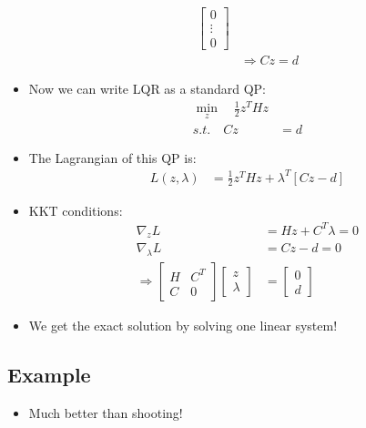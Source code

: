 \documentclass[11pt]{article}
\begin{document}
\begin{itemize}
\begin{align*}
\begin{bmatrix}
            0 \\
            \vdots \\
            0
        \end{bmatrix}
        \\
        &\Rightarrow Cz = d
    \end{align*}
    \item Now we can write LQR as a standard QP:
    \begin{align*}
        \min_z \quad \frac{1}{2}z^THz
        \\
        s.t. \quad Cz &= d
    \end{align*}
    \item The Lagrangian of this QP is:
    \begin{align*}
        L(z,\lambda) &= \frac{1}{2}z^THz + \lambda^T[Cz-d]
    \end{align*}
    \item  KKT conditions:
    \begin{align*}
        \nabla_zL &= Hz + C^T\lambda = 0
        \\
        \nabla_\lambda L &= Cz-d = 0
        \\
        \Rightarrow \begin{bmatrix}
            H & C^T \\
            C & 0
        \end{bmatrix}
        \begin{bmatrix}
            z \\
            \lambda
        \end{bmatrix}
        &=
        \begin{bmatrix}
            0 \\
            d
        \end{bmatrix}
    \end{align*}
    \item We get the exact solution by solving one linear system!
\end{itemize}
\subsection{Example}
\begin{itemize}
    \item Much better than shooting!
\end{itemize}
\end{document}
